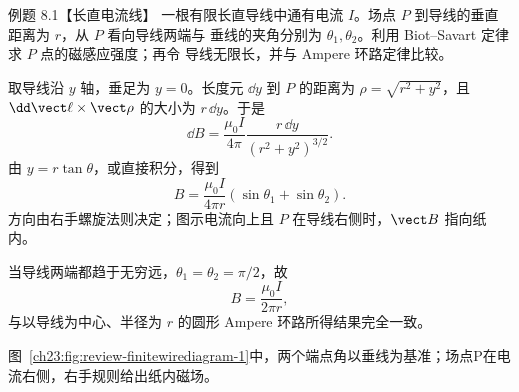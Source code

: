 \begin{origexamplebox}{例题 8.1【长直电流线】}
一根有限长直导线中通有电流 $I$。场点 $P$ 到导线的垂直距离为 $r$，从 $P$ 看向导线两端与
垂线的夹角分别为 $\theta_1,\theta_2$。利用 Biot--Savart 定律求 $P$ 点的磁感应强度；再令
导线无限长，并与 Ampere 环路定律比较。

%
\begin{center}
\end{center}
\label{fig:em23-question-1}
\end{origexamplebox}

\begin{xesolution}
取导线沿 $y$ 轴，垂足为 $y=0$。长度元 $\dd y$ 到 $P$ 的距离为
$\rho=\sqrt{r^2+y^2}$，且 $\dd\vect\ell\times\vect\rho$ 的大小为 $r\,\dd y$。于是
\[
  \dd B=\frac{\mu_0I}{4\pi}\frac{r\,\dd y}{(r^2+y^2)^{3/2}}.
\]
由 $y=r\tan\theta$，或直接积分，得到
\begin{equation}
  \boxed{B=\frac{\mu_0I}{4\pi r}
  (\sin\theta_1+\sin\theta_2)}.
\end{equation}
方向由右手螺旋法则决定；图示电流向上且 $P$ 在导线右侧时，$\vect B$ 指向纸内。

当导线两端都趋于无穷远，$\theta_1=\theta_2=\pi/2$，故
\[
  \boxed{B=\frac{\mu_0I}{2\pi r}},
\]
与以导线为中心、半径为 $r$ 的圆形 Ampere 环路所得结果完全一致。

图~\ref{ch23:fig:review-finitewirediagram-1}中，两个端点角以垂线为基准；场点P在电流右侧，右手规则给出纸内磁场。
\par\noindent\begin{minipage}{\linewidth}
\finiteWireDiagram
{}\label{ch23:fig:review-finitewirediagram-1}
\end{minipage}\par\medskip
\end{xesolution}

